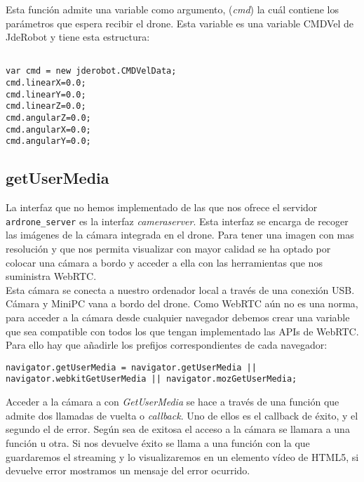 Esta función admite una variable como argumento, (\emph{cmd}) la cuál contiene los parámetros que espera recibir el drone. Esta variable es una variable CMDVel de JdeRobot y tiene esta estructura:\\

\begin{lstlisting}[caption=Variable CMD]

var cmd = new jderobot.CMDVelData; 
cmd.linearX=0.0;
cmd.linearY=0.0;
cmd.linearZ=0.0;
cmd.angularZ=0.0;
cmd.angularX=0.0;
cmd.angularY=0.0;

\end{lstlisting}




\subsection{getUserMedia}

La interfaz que no hemos implementado de las que nos ofrece el servidor \texttt{ardrone\_server} es la interfaz \emph{cameraserver}. Esta interfaz se encarga de recoger las imágenes de la cámara integrada en el drone. Para tener una imagen con mas resolución y que nos permita visualizar con mayor calidad se ha optado por colocar una cámara a bordo y acceder a ella con las herramientas que nos suministra WebRTC.\\

Esta cámara se conecta a nuestro ordenador local a través de una conexión USB. Cámara y MiniPC vana a bordo del drone. Como WebRTC aún no es una norma, para acceder a la cámara desde cualquier navegador debemos crear una variable que sea compatible con todos los que tengan implementado las APIs de WebRTC. Para ello hay que añadirle los prefijos correspondientes de cada navegador:\\


\begin{lstlisting}[caption=Variable de getUserMedia.]
navigator.getUserMedia = navigator.getUserMedia || navigator.webkitGetUserMedia || navigator.mozGetUserMedia;
\end{lstlisting}


Acceder a la cámara a con \emph{GetUserMedia} se hace a través de una función que admite dos llamadas de vuelta o \emph{callback}. Uno de ellos es el callback de éxito, y el segundo el de error. Según sea de exitosa el acceso a la cámara se llamara a una función u otra. Si nos devuelve éxito se llama a una función con la que guardaremos el streaming y lo visualizaremos en un elemento vídeo de HTML5, si devuelve error mostramos un mensaje del error ocurrido.\\

